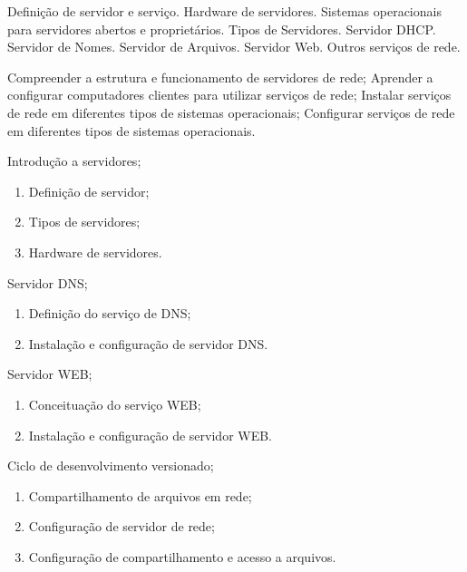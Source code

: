 
\begin{pud}
	
	
	\ementa
	Definição de servidor e serviço. Hardware de servidores. Sistemas operacionais para servidores abertos e proprietários. Tipos de Servidores. Servidor DHCP. Servidor de Nomes. Servidor de Arquivos. Servidor Web. Outros serviços de rede.
	
	\objetivos
	Compreender a estrutura e funcionamento de servidores de rede; Aprender a configurar computadores clientes para utilizar serviços de rede;  Instalar serviços de rede em diferentes tipos de sistemas operacionais; Configurar serviços de rede em diferentes tipos de sistemas operacionais.
	
	\programa
	\begin{description}[itemsep=0em]
		\item[UNIDADE I:] Introdução a servidores; 
	         \begin{enumerate}[itemsep=0em, topsep=0em]
				\item Definição de servidor;
				\item Tipos de servidores;
				\item Hardware de servidores.
            \end{enumerate}
            
        \item[UNIDADE II:] Servidor DNS;
	         \begin{enumerate}[itemsep=0em, topsep=0em]
				\item Definição do serviço de DNS;
				\item Instalação e configuração de servidor DNS.
            \end{enumerate}
            
         \item[UNIDADE III:] Servidor WEB;
	         \begin{enumerate}[itemsep=0em, topsep=0em]
				\item Conceituação do serviço WEB;
				\item Instalação e configuração de servidor WEB.        
            \end{enumerate}
            
         \item[UNIDADE IV:]  Ciclo de desenvolvimento versionado;
	         \begin{enumerate}[itemsep=0em, topsep=0em]
				\item Compartilhamento de arquivos em rede;
				\item Configuração de servidor de rede;
				\item Configuração de compartilhamento e acesso a arquivos.
            \end{enumerate}
            

\end{description}
\end{pud}
